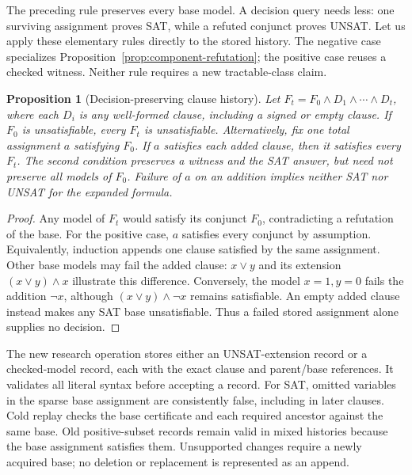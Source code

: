 \documentclass[11pt,a4paper]{article}
\numberwithin{equation}{section}
\theoremstyle{plain}
\newtheorem{proposition}[lemma]{Proposition}
\theoremstyle{definition}
\theoremstyle{remark}
\begin{document}
The preceding rule preserves every base model. A decision query needs less: one surviving assignment proves SAT, while a refuted conjunct proves UNSAT. Let us apply these elementary rules directly to the stored history. The negative case specializes Proposition~\ref{prop:component-refutation}; the positive case reuses a checked witness. Neither rule requires a new tractable-class claim.

\begin{proposition}[Decision-preserving clause history]
\label{prop:decision-history}
Let $F_t=F_0\land D_1\land\cdots\land D_t$, where each $D_i$ is any well-formed clause, including a signed or empty clause.
If $F_0$ is unsatisfiable, every $F_t$ is unsatisfiable.
Alternatively, fix one total assignment $a$ satisfying $F_0$. If $a$ satisfies each added clause, then it satisfies every $F_t$.
The second condition preserves a witness and the SAT answer, but need not preserve all models of $F_0$. Failure of $a$ on an addition implies neither SAT nor UNSAT for the expanded formula.
\end{proposition}

\begin{proof}
Any model of $F_t$ would satisfy its conjunct $F_0$, contradicting a refutation of the base. For the positive case, $a$ satisfies every conjunct by assumption. Equivalently, induction appends one clause satisfied by the same assignment. Other base models may fail the added clause: $x\lor y$ and its extension $(x\lor y)\land x$ illustrate this difference. Conversely, the model $x=1,y=0$ fails the addition $\neg x$, although $(x\lor y)\land\neg x$ remains satisfiable. An empty added clause instead makes any SAT base unsatisfiable. Thus a failed stored assignment alone supplies no decision.
\end{proof}

The new research operation stores either an UNSAT-extension record or a checked-model record, each with the exact clause and parent/base references. It validates all literal syntax before accepting a record. For SAT, omitted variables in the sparse base assignment are consistently false, including in later clauses. Cold replay checks the base certificate and each required ancestor against the same base. Old positive-subset records remain valid in mixed histories because the base assignment satisfies them. Unsupported changes require a newly acquired base; no deletion or replacement is represented as an append.
\end{document}
